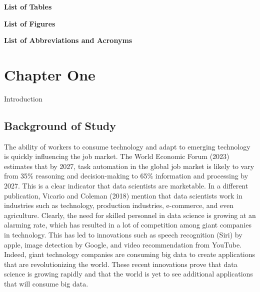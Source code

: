 \documentclass[
  12pt,
]{article}
\begin{document}
\newpage

\centering
\raggedright
\newpage
\tableofcontents

\newpage

\begin{centering}

{\bf List of Tables}

\end{centering}

\doublespacing
\large

\newpage

\begin{centering}

{\bf List of Figures}

\end{centering}

\doublespacing
\large

\newpage

\begin{centering}

{\bf List of Abbreviations and Acronyms}

\end{centering}

\doublespacing
\large

\newpage

\doublespacing
\large

\section{Chapter One}\label{chapter-one}

Introduction

\subsection{Background of Study}\label{background-of-study}

The ability of workers to consume technology and adapt to emerging
technology is quickly influencing the job market. The World Economic
Forum (2023) estimates that by 2027, task automation in the global job
market is likely to vary from 35\% reasoning and decision-making to 65\%
information and processing by 2027. This is a clear indicator that data
scientists are marketable. In a different publication, Vicario and
Coleman (2018) mention that data scientists work in industries such as
technology, production industries, e-commerce, and even agriculture.
Clearly, the need for skilled personnel in data science is growing at an
alarming rate, which has resulted in a lot of competition among giant
companies in technology. This has led to innovations such as speech
recognition (Siri) by apple, image detection by Google, and video
recommendation from YouTube. Indeed, giant technology companies are
consuming big data to create applications that are revolutionizing the
world. These recent innovations prove that data science is growing
rapidly and that the world is yet to see additional applications that
will consume big data.
\end{document}
